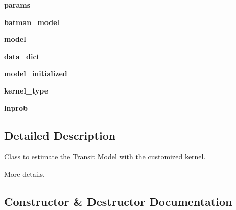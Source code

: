 \begin{DoxyCompactItemize}
{\bfseries params}
\item 
\mbox{\label{classexospec_1_1_transit_model_1_1_transit_model_a8b65c942ed9dcba9fee8b8acbd375cbc}} 
{\bfseries batman\+\_\+model}
\item 
\mbox{\label{classexospec_1_1_transit_model_1_1_transit_model_aa95ce17554f42e897a72baa6e17496d0}} 
{\bfseries model}
\item 
\mbox{\label{classexospec_1_1_transit_model_1_1_transit_model_a0e156dc433419b4b8647ad2746427a7c}} 
{\bfseries data\+\_\+dict}
\item 
\mbox{\label{classexospec_1_1_transit_model_1_1_transit_model_a6f260ff899915ec7ed640308c05dab5e}} 
{\bfseries model\+\_\+initialized}
\item 
\mbox{\label{classexospec_1_1_transit_model_1_1_transit_model_a454db430fc4a7443d3d68d3ef45d6d37}} 
{\bfseries kernel\+\_\+type}
\item 
\mbox{\label{classexospec_1_1_transit_model_1_1_transit_model_a6b1f393a39f1ab768746334cde5d2a47}} 
{\bfseries lnprob}
\end{DoxyCompactItemize}


\subsection{Detailed Description}
Class to estimate the Transit Model with the customized kernel. 

More details. 

\subsection{Constructor \& Destructor Documentation}
\mbox{\label{classexospec_1_1_transit_model_1_1_transit_model_a8e145f1b5965295abcc770f0e72a41b8}} 
